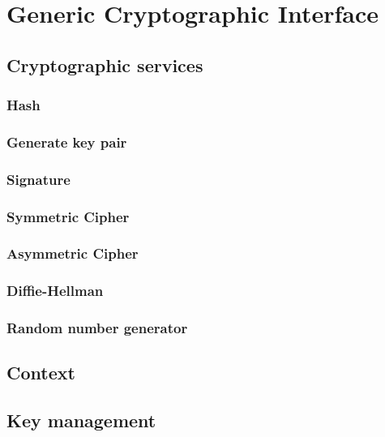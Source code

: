 \chapter{Generic Cryptographic Interface}

\section{Cryptographic services}

\subsection{Hash}

\subsection{Generate key pair}

\subsection{Signature}

\subsection{Symmetric Cipher}

\subsection{Asymmetric Cipher}

\subsection{Diffie-Hellman}

\subsection{Random number generator}

\section{Context}

\section{Key management}